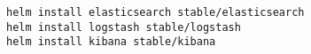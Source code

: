   \begin{verbatim}
helm install elasticsearch stable/elasticsearch
helm install logstash stable/logstash
helm install kibana stable/kibana
  \end{verbatim}